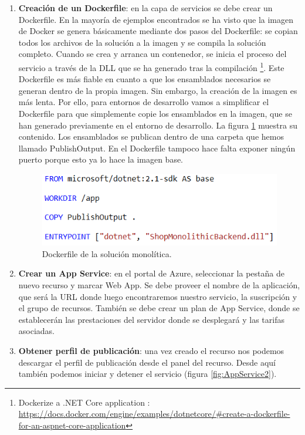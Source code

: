 \documentclass[11pt,spanish,listoffigures]{tfgetsinf}
\begin{document}
\begin{enumerate}

\item \textbf{Creación de un Dockerfile}: en la capa de servicios se debe crear un Dockerfile. En la mayoría de ejemplos encontrados se ha visto que la imagen de Docker se genera básicamente mediante dos pasos del Dockerfile: se copian todos los archivos de la solución a la imagen y se compila la solución completo. Cuando se crea y arranca un contenedor, se inicia el proceso del servicio a través de la DLL que se ha generado tras la compilación \footnote{ Dockerize a .NET Core application
: \url{https://docs.docker.com/engine/examples/dotnetcore/\#create-a-dockerfile-for-an-aspnet-core-application}}. Este Dockerfile es más fiable en cuanto a que los ensamblados necesarios se generan dentro de la propia imagen. Sin embargo, la creación de la imagen es más lenta. Por ello, para entornos de desarrollo vamos a simplificar el Dockerfile para que simplemente copie los ensamblados en la imagen, que se han generado previamente en el entorno de desarrollo. La figura \ref{fig:Dockerfile} muestra su contenido. Los ensamblados se publican dentro de una carpeta que hemos llamado PublishOutput. En el Dockerfile tampoco hace falta exponer ningún puerto porque esto ya lo hace la imagen base.

\begin{figure}[h]
\centering
\includegraphics[scale=0.8]{Dockerfile}
\caption{Dockerfile de la solución monolítica.}
\label{fig:Dockerfile}
\end{figure}

\item \textbf{Crear un App Service}: en el portal de Azure, seleccionar la pestaña de nuevo recurso y marcar Web App. Se debe proveer el nombre de la aplicación, que será la URL donde luego encontraremos nuestro servicio, la suscripción y el grupo de recursos. También se debe crear un plan de App Service, donde se establecerán las prestaciones del servidor donde se desplegará y las tarifas asociadas. 

\item \textbf{Obtener perfil de publicación}: una vez creado el recurso nos podemos descargar el perfil de publicación desde el panel del recurso. Desde aquí también  podemos iniciar y detener el servicio (figura \ref{fig:AppService2}).


\end{enumerate}
\end{document}
